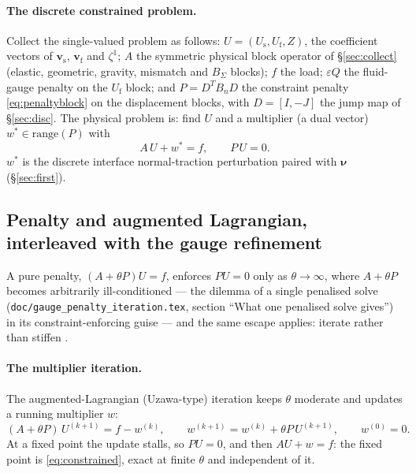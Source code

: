 \documentclass[11pt]{article}
\newcommand{\eps}{\varepsilon}
\newcommand{\bnu}{\bm{\nu}}
\newcommand{\bv}{\mathbf{v}}
\begin{document}
\paragraph{The discrete constrained problem.} Collect the single-valued
problem as follows: $U = (U_{\mathrm{s}}, U_{\mathrm{f}}, Z)$, the
coefficient vectors of $\bv_{\mathrm{s}}$, $\bv_{\mathrm{f}}$ and
$\zeta^1$; $A$ the symmetric physical block operator of
\S\ref{sec:collect} (elastic, geometric, gravity, mismatch and
$B_\Sigma$ blocks); $f$ the load; $\eps Q$ the fluid-gauge penalty on
the $U_{\mathrm{f}}$ block; and $P = D^{T}B_nD$ the constraint penalty
\eqref{eq:penaltyblock} on the displacement blocks, with $D = [I, -J]$
the jump map of \S\ref{sec:disc}. The physical problem is: find $U$ and
a multiplier (a dual vector) $w^*\in\mathrm{range}(P)$ with
\begin{equation}
  A\,U + w^* = f, \qquad P\,U = 0 .
  \label{eq:constrained}
\end{equation}
$w^*$ is the discrete interface normal-traction perturbation paired with
$\bnu$ (\S\ref{sec:first}).

\subsection{Penalty and augmented Lagrangian, interleaved with the gauge
refinement}
\label{sec:al}

A pure penalty, $(A + \theta P)U = f$, enforces $PU = 0$ only as
$\theta \to \infty$, where $A + \theta P$ becomes arbitrarily
ill-conditioned --- the dilemma of a single penalised solve
(\texttt{doc/gauge\_penalty\_iteration.tex}, section ``What one
penalised solve gives'') in its constraint-enforcing guise --- and the
same escape applies: iterate rather than stiffen
\cite{Hestenes1969,Powell1969,FortinGlowinski}.

\paragraph{The multiplier iteration.} The augmented-Lagrangian
(Uzawa-type) iteration keeps $\theta$ moderate and updates a running
multiplier $w$:
\begin{equation}
  (A + \theta P)\,U^{(k+1)} = f - w^{(k)}, \qquad
  w^{(k+1)} = w^{(k)} + \theta P\,U^{(k+1)}, \qquad w^{(0)} = 0 .
  \label{eq:alplain}
\end{equation}
At a fixed point the update stalls, so $PU = 0$, and then
$AU + w = f$: the fixed point is \eqref{eq:constrained}, exact at
finite $\theta$ and independent of it.
\end{document}
